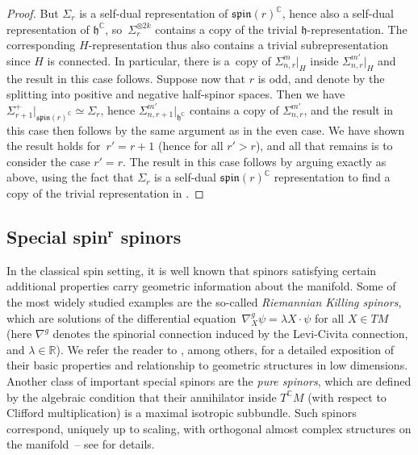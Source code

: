 \documentclass[pdftex]{sigma}
\numberwithin{equation}{section}
\newcommand{\R}{\mathbb{R}} %
\newcommand{\C}{\mathbb{C}} %
\begin{document}
\begin{proof}
 But $\Sigma_r$ is a self-dual representation of $\mathfrak{spin}(r)^{\C}$, hence also a self-dual representation of $\mathfrak{h}^{\C}$, so~$\Sigma_r^{\otimes 2k}$ contains a copy of the trivial $\mathfrak{h}$-representation. The corresponding $H$-representation thus also contains a trivial subrepresentation since $H$ is connected. In particular, there is a~copy of $\Sigma^m_{n,r}\rvert_H$ inside $\Sigma^{m'}_{n,r}\rvert_H$ and the result in this case follows. Suppose now that $r$ is odd, and denote by  the splitting into positive and negative half-spinor spaces. Then we have~${\Sigma_{r+1}^+\rvert_{\mathfrak{spin}(r)^{\C}} \simeq \Sigma_r}$, hence $\Sigma^{m'}_{n,r+1}\rvert_{\mathfrak{h}^{\C}}$ contains a copy of $\Sigma_{n,r}^{m'}$, and the result in this case then follows by the same argument as in the even case. We have shown the result holds for~${r'=r+1}$ (hence for all $r'>r$), and all that remains is to consider the case $r'=r$. The result in this case follows by arguing exactly as above, using the fact that $\Sigma_r$ is a self-dual $\mathfrak{spin}(r)^{\C}$ representation to find a copy of the trivial representation in .
		\end{proof}
		
		
		\subsection[Special spin\^{}r spinors]{Special spin$^{\boldsymbol{r}}$ spinors}
		
		In the classical spin setting, it is well known that spinors satisfying certain additional properties carry geometric information about the manifold. Some of the most widely studied examples are the so-called \emph{Riemannian Killing spinors}, which are solutions of the differential equation~${
\nabla^g_X \psi = \lambda X\cdot \psi}$ for all $ X\in TM$
		(here $\nabla^g$ denotes the spinorial connection induced by the Levi-Civita connection, and $\lambda \in \R$). We refer the reader to \cite{Bar93,BFGK,FKMS97,Gru90}, among others, for a detailed exposition of their basic properties and relationship to geometric structures in low dimensions. Another class of important special spinors are the \emph{pure spinors}, which are defined by the algebraic condition that their annihilator inside $T^{\C}M$ (with respect to Clifford multiplication) is a maximal isotropic subbundle. Such spinors correspond, uniquely up to scaling, with orthogonal almost complex structures on the manifold~-- see \cite[Chapter 9]{LM} for details.
		
\end{document}
